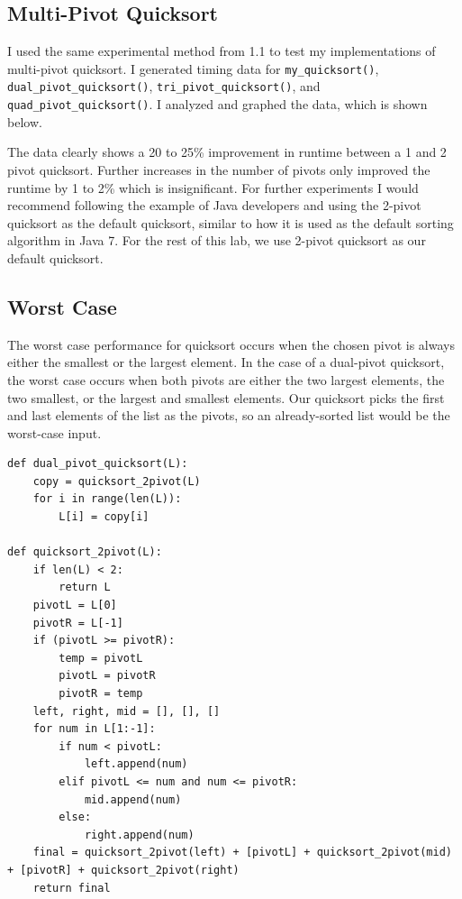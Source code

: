 \documentclass[12pt]{article}
\begin{document}
\subsection{Multi-Pivot Quicksort}
I used the same experimental method from 1.1 to test my implementations of multi-pivot quicksort. I generated timing data for \verb+my_quicksort()+, \verb+dual_pivot_quicksort()+, \verb+tri_pivot_quicksort()+, and \verb+quad_pivot_quicksort()+. I analyzed and graphed the data, which is shown below.



The data clearly shows a 20 to 25\% improvement in runtime between a 1 and 2 pivot quicksort. Further increases in the number of pivots only improved the runtime by 1 to 2\% which is insignificant. For further experiments I would recommend following the example of Java developers and using the 2-pivot quicksort as the default quicksort, similar to how it is used as the default sorting algorithm in Java 7. For the rest of this lab, we use 2-pivot quicksort as our default quicksort.

\subsection{Worst Case}
The worst case performance for quicksort occurs when the chosen pivot is always either the smallest or the largest element. In the case of a dual-pivot quicksort, the worst case occurs when both pivots are either the two largest elements, the two smallest, or the largest and smallest elements. Our quicksort picks the first and last elements of the list as the pivots, so an already-sorted list would be the worst-case input. 

\footnotesize
\begin{verbatim}
def dual_pivot_quicksort(L):
    copy = quicksort_2pivot(L)
    for i in range(len(L)):
        L[i] = copy[i]

def quicksort_2pivot(L):
    if len(L) < 2:
        return L
    pivotL = L[0]
    pivotR = L[-1]
    if (pivotL >= pivotR):
        temp = pivotL
        pivotL = pivotR
        pivotR = temp
    left, right, mid = [], [], []
    for num in L[1:-1]:
        if num < pivotL:
            left.append(num)
        elif pivotL <= num and num <= pivotR:
            mid.append(num)
        else:
            right.append(num)
    final = quicksort_2pivot(left) + [pivotL] + quicksort_2pivot(mid) + [pivotR] + quicksort_2pivot(right)
    return final
\end{verbatim}
\normalsize
\end{document}
